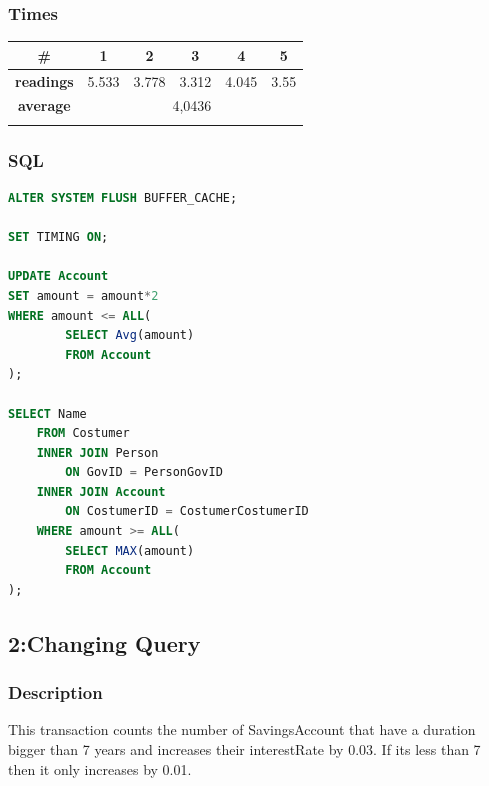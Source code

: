 \documentclass[a4paper, 10pt]{article}
\begin{document}
\subsubsection{Times}
\begin{table}[H]
\centering
\begin{tabular}{cccccc}
\hline
\multicolumn{1}{|c|}{\textbf{\#}}       & \multicolumn{1}{c|}{\textbf{1}} & \multicolumn{1}{c|}{\textbf{2}} & \multicolumn{1}{c|}{\textbf{3}} & \multicolumn{1}{c|}{\textbf{4}} & \multicolumn{1}{c|}{\textbf{5}} \\ \hline
\multicolumn{1}{|c|}{\textbf{readings}} & \multicolumn{1}{c|}{5.533}           & \multicolumn{1}{c|}{3.778}           & \multicolumn{1}{c|}{3.312}           & \multicolumn{1}{c|}{4.045}           & \multicolumn{1}{c|}{3.55}           \\ \hline
\multicolumn{1}{|c|}{\textbf{average}}      & \multicolumn{5}{c|}{4,0436}                                                                                                                                                   \\ \hline
\textbf{}                               & \textbf{}                       & \textbf{}                       & \textbf{}                       & \textbf{}                       & \textbf{}                      
\end{tabular}
\end{table}
\subsubsection{SQL}
\begin{lstlisting}[language=SQL]
ALTER SYSTEM FLUSH BUFFER_CACHE;

SET TIMING ON;

UPDATE Account 
SET amount = amount*2 
WHERE amount <= ALL(
        SELECT Avg(amount) 
        FROM Account 
);

SELECT Name
    FROM Costumer
    INNER JOIN Person
        ON GovID = PersonGovID 
    INNER JOIN Account 
        ON CostumerID = CostumerCostumerID
    WHERE amount >= ALL(
        SELECT MAX(amount) 
        FROM Account 
);
\end{lstlisting}

\subsection{2:Changing Query}
\subsubsection{Description}
This transaction counts the number of SavingsAccount that have a duration bigger than 7 years and increases their interestRate by 0.03. If its less than 7 then it only increases by 0.01.
\end{document}
